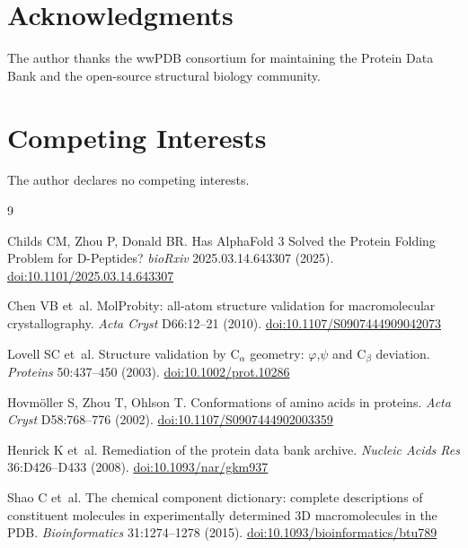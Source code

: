 \documentclass[11pt]{article}
\begin{document}
\section*{Acknowledgments}

The author thanks the wwPDB consortium for maintaining the Protein Data Bank and the open-source structural biology community.

\section*{Competing Interests}

The author declares no competing interests.

\begin{thebibliography}{9}

Childs CM, Zhou P, Donald BR.
\newblock Has AlphaFold 3 Solved the Protein Folding Problem for D-Peptides?
\newblock \textit{bioRxiv} 2025.03.14.643307 (2025).
\newblock \href{https://doi.org/10.1101/2025.03.14.643307}{doi:10.1101/2025.03.14.643307}

Chen VB et~al.
\newblock MolProbity: all-atom structure validation for macromolecular crystallography.
\newblock \textit{Acta Cryst} D66:12--21 (2010).
\newblock \href{https://doi.org/10.1107/S0907444909042073}{doi:10.1107/S0907444909042073}

Lovell SC et~al.
\newblock Structure validation by C$_\alpha$ geometry: $\varphi$,$\psi$ and C$_\beta$ deviation.
\newblock \textit{Proteins} 50:437--450 (2003).
\newblock \href{https://doi.org/10.1002/prot.10286}{doi:10.1002/prot.10286}

Hovm{\"o}ller S, Zhou T, Ohlson T.
\newblock Conformations of amino acids in proteins.
\newblock \textit{Acta Cryst} D58:768--776 (2002).
\newblock \href{https://doi.org/10.1107/S0907444902003359}{doi:10.1107/S0907444902003359}

Henrick K et~al.
\newblock Remediation of the protein data bank archive.
\newblock \textit{Nucleic Acids Res} 36:D426--D433 (2008).
\newblock \href{https://doi.org/10.1093/nar/gkm937}{doi:10.1093/nar/gkm937}

Shao C et~al.
\newblock The chemical component dictionary: complete descriptions of constituent molecules in experimentally determined 3D macromolecules in the PDB.
\newblock \textit{Bioinformatics} 31:1274--1278 (2015).
\newblock \href{https://doi.org/10.1093/bioinformatics/btu789}{doi:10.1093/bioinformatics/btu789}


\end{thebibliography}
\end{document}
